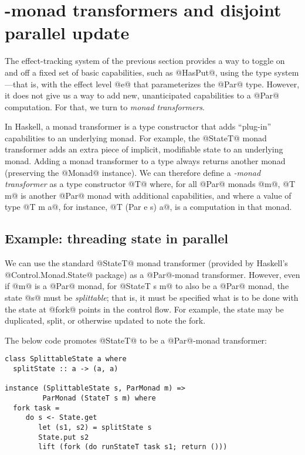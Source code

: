 \section{-monad transformers and disjoint parallel update}\label{s:lvish-disjoint}

The effect-tracking system of the previous section provides a way to
toggle on and off a fixed set of basic capabilities, such as @HasPut@,
using the type system---that is, with the effect level @e@ that
parameterizes the @Par@ type.  However, it does not give us a way to
add new, unanticipated capabilities to a @Par@ computation.  For that,
we turn to \emph{monad transformers}.

In Haskell, a monad transformer is a type constructor that adds
``plug-in'' capabilities to an underlying monad.  For example, the
@StateT@ monad transformer adds an extra piece of implicit, modifiable
state to an underlying monad.  Adding a monad transformer to a type
always returns another monad (preserving the @Monad@ instance).  We
can therefore define a \emph{-monad transformer} as a type
constructor @T@ where, for all @Par@ monads @m@, @T m@ is another
@Par@ monad with additional capabilities, and where a value of type
@T m a@, for instance, @T (Par e s) a@, is a computation in that monad.

\subsection{Example: threading state in parallel}

We can use the standard @StateT@ monad transformer (provided by
Haskell's @Control.Monad.State@ package) as a @Par@-monad transformer.
However, even if @m@ is a @Par@ monad, for @StateT s m@ to also be a
@Par@ monad, the state @s@ must be \emph{splittable}; that is, it must
be specified what is to be done with the state at @fork@ points in the
control flow.  For example, the state may be duplicated, split, or
otherwise updated to note the fork.

The below code promotes @StateT@ to be a @Par@-monad transformer:


\singlespacing
\begin{lstlisting}
class SplittableState a where
  splitState :: a -> (a, a)

instance (SplittableState s, ParMonad m) => 
         ParMonad (StateT s m) where  
  fork task =
     do s <- State.get 
        let (s1, s2) = splitState s
        State.put s2
        lift (fork (do runStateT task s1; return ()))
\end{lstlisting}
\doublespacing

